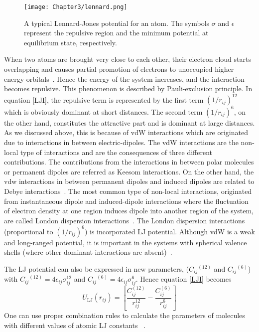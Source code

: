 \begin{figure}[h!]
\centering
\texttt{[image: Chapter3/lennard.png]}
\caption[A typical Lennard-Jones potential.]{ A typical  Lennard-Jones potential for an atom. The symbols $\sigma$ and $\epsilon$ represent the repulsive region and the minimum potential at equilibrium state, respectively.}
\label{lennard}
\end{figure}

When two atoms are brought very close to each other, their electron cloud starts overlapping and causes 
partial promotion of electrons to unoccupied higher energy orbitals~\citep{Kittel2005}. Hence the energy of the system increases, and the interaction becomes repulsive. This phenomenon is described by Pauli-exclusion principle. In equation \ref{LJI}, the repulsive term is represented by the first term $({1}/{r_{ij}})^{12}$ which is obviously dominant at short distances. The second term $({1}/{r_{ij}})^6$, on the other hand, constitutes the attractive part and is dominant at large distances. As we discussed above, this is because of vdW interactions which are originated due to interactions in between electric-dipoles. The vdW interactions are the non-local type of interactions and are the consequences of three different contributions. The contributions from the interactions in between polar molecules or permanent dipoles are referred as Keesom interactions. On the other hand, the vdw interactions in between permanent dipoles and induced dipoles are related to Debye interactions~\citep{Stone1996, Ulman2014}. The most common type of non-local interactions, originated from instantaneous dipole and induced-dipole interactions where the fluctuation of electron density at one region induces dipole into another region of the system, are called London dispersion interactions~\citep{Klime2012}. The London dispersion interactions (proportional to $(1/r_{ij})^6$) is incorporated LJ potential. Although vdW is a weak and long-ranged potential, it is important in the systems with spherical valence shells (where other dominant interactions are absent)~\citep{Leach2001}.

The LJ potential can also be expressed in new parameters, (${C_{ij}}^{(12)}$ and ${C_{ij}}^{(6)}$) 
with ${C_{ij}}^{(12)}= 4\epsilon_{ij} \sigma_{ij}^{12}$ and ${C_{ij}}^{(6)} = 4\epsilon_{ij} \sigma_{ij}^6$. 
Hence equation \ref{LJI} becomes 
\begin{equation}\label{LJ}
U_{\text{LJ}}(r_{ij}) = \left[\frac{C_{ij}^{(12)}}{r_{ij}^{12} } - \frac{C_{ij}^{(6)}}{r_{ij}^6 }\right]
\end{equation}
One can use proper combination rules to calculate the parameters of molecules with different values of atomic LJ constants~ \citep{Gromacs-manual}.

